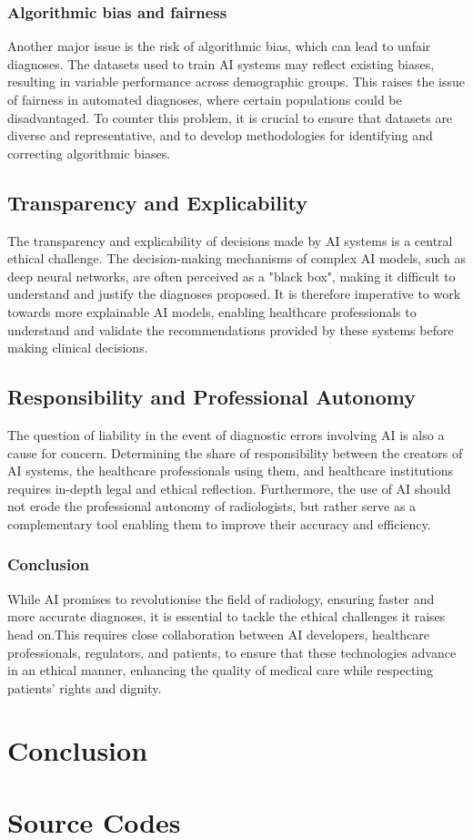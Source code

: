 \documentclass[12pt,oneside]{book} %
\begin{document}
\subsection{Algorithmic bias and fairness}

Another major issue is the risk of algorithmic bias, which can lead to unfair
diagnoses. The datasets used to train AI systems may reflect existing biases,
resulting in variable performance across demographic groups. This raises the
issue of fairness in automated diagnoses, where certain populations could be
disadvantaged. To counter this problem, it is crucial to ensure that datasets
are diverse and representative, and to develop methodologies for identifying
and correcting algorithmic biases.

\section{Transparency and Explicability}

The transparency and explicability of decisions made by AI systems is a central
ethical challenge. The decision-making mechanisms of complex AI models, such as
deep neural networks, are often perceived as a "black box", making it difficult
to understand and justify the diagnoses proposed. It is therefore imperative to
work towards more explainable AI models, enabling healthcare professionals to
understand and validate the recommendations provided by these systems before
making clinical decisions.

\section{Responsibility and Professional Autonomy}

The question of liability in the event of diagnostic errors involving AI is
also a cause for concern. Determining the share of responsibility between the
creators of AI systems, the healthcare professionals using them, and healthcare
institutions requires in-depth legal and ethical reflection. Furthermore, the
use of AI should not erode the professional autonomy of radiologists, but
rather serve as a complementary tool enabling them to improve their accuracy
and efficiency.

\subsection{Conclusion}

While AI promises to revolutionise the field of radiology, ensuring faster and
more accurate diagnoses, it is essential to tackle the ethical challenges it
raises head on.This requires close collaboration between AI developers,
healthcare professionals, regulators, and patients, to ensure that these
technologies advance in an ethical manner, enhancing the quality of medical
care while respecting patients' rights and dignity.

\chapter{Conclusion}




\appendix
\chapter{Source Codes}

\end{document}
